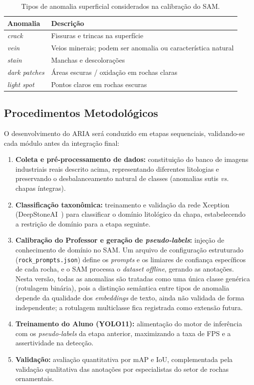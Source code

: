 \documentclass[12pt]{article}
\begin{document}
\begin{table}[ht]
\centering
\caption{Tipos de anomalia superficial considerados na calibração do SAM.}
\label{tab:anomalias}
\begin{tabular}{ll}
\hline
\textbf{Anomalia} & \textbf{Descrição} \\
\hline
\textit{crack} & Fissuras e trincas na superfície \\
\textit{vein} & Veios minerais; podem ser anomalia ou característica natural \\
\textit{stain} & Manchas e descolorações \\
\textit{dark patches} & Áreas escuras / oxidação em rochas claras \\
\textit{light spot} & Pontos claros em rochas escuras \\
\hline
\end{tabular}
\end{table}

\subsection{Procedimentos Metodológicos}

O desenvolvimento do ARIA será conduzido em etapas sequenciais, validando-se cada módulo antes da integração final:

\begin{enumerate}
  \item \textbf{Coleta e pré-processamento de dados:} constituição do banco de imagens industriais reais descrito acima, representando diferentes litologias e preservando o desbalanceamento natural de classes (anomalias sutis \textit{vs.} chapas íntegras).
  \item \textbf{Classificação taxonômica:} treinamento e validação da rede Xception (DeepStoneAI~\cite{deepstoneai_moreira2025}) para classificar o domínio litológico da chapa, estabelecendo a restrição de domínio para a etapa seguinte.
  \item \textbf{Calibração do Professor e geração de \textit{pseudo-labels}:} injeção de conhecimento de domínio no SAM. Um arquivo de configuração estruturado (\texttt{rock\_prompts.json}) define os \textit{prompts} e os limiares de confiança específicos de cada rocha, e o SAM processa o \textit{dataset} \textit{offline}, gerando as anotações. Nesta versão, todas as anomalias são tratadas como uma única classe genérica (rotulagem binária), pois a distinção semântica entre tipos de anomalia depende da qualidade dos \textit{embeddings} de texto, ainda não validada de forma independente; a rotulagem multiclasse fica registrada como extensão futura.
  \item \textbf{Treinamento do Aluno (YOLO11):} alimentação do motor de inferência com os \textit{pseudo-labels} da etapa anterior, maximizando a taxa de FPS e a assertividade na detecção.
  \item \textbf{Validação:} avaliação quantitativa por mAP e IoU, complementada pela validação qualitativa das anotações por especialistas do setor de rochas ornamentais.
\end{enumerate}
\end{document}
